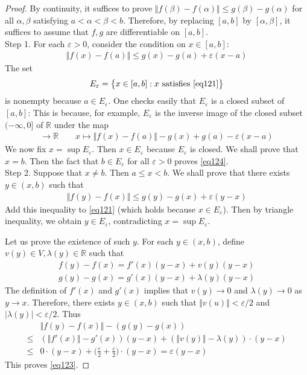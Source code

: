 \documentclass[12pt,b5paper,notitlepage]{article}
\theoremstyle{definition}
\theoremstyle{plain}
\newcommand{\Rbb}{\mathbb R}
\newcommand{\eps}{\varepsilon}
\numberwithin{equation}{section}
\begin{document}
\begin{proof}
By continuity, it suffices to prove $\Vert f(\beta)-f(\alpha)\Vert\leq g(\beta)-g(\alpha)$ for all $\alpha,\beta$ satisfying $a<\alpha<\beta<b$. Therefore, by replacing $[a,b]$ by $[\alpha,\beta]$, it suffices to assume that $f,g$ are differentiable on $[a,b]$.\\[-1ex]

Step 1. For each $\eps>0$, consider the condition on $x\in[a,b]$:
\begin{align}
\Vert f(x)-f(a)\Vert\leq g(x)-g(a)+\eps(x-a)\label{eq121}
\end{align}
The set
\begin{align*}
E_\eps=\big\{x\in[a,b]:x\text{ satisfies \eqref{eq121}}\big\}
\end{align*}
is nonempty because $a\in E_\eps$. One checks easily that $E_\eps$ is a closed subset of $[a,b]$: This is because, for example, $E_\eps$ is the inverse image of the closed subset $(-\infty,0]$ of $\Rbb$ under the map
\begin{gather}
[a,b]\rightarrow\Rbb\qquad x\mapsto \Vert f(x)-f(a)\Vert- g(x)+g(a)-\eps(x-a)  \label{eq122}
\end{gather}
We now fix $x=\sup E_\eps$. Then $x\in E_\eps$ because $E_\eps$ is closed. We shall prove that $x=b$. Then the fact that $b\in E_\eps$ for all $\eps>0$ proves \eqref{eq124}.\\[-1ex]


Step 2. Suppose that $x\neq b$. Then $a\leq x<b$. We shall prove that there exists $y\in(x,b)$ such that
\begin{align}
\Vert f(y)-f(x)\Vert\leq g(y)-g(x)+\eps(y-x) \label{eq123}
\end{align}
Add this inequality to \eqref{eq121} (which holds because $x\in E_\eps$). Then by triangle inequality, we obtain $y\in E_\eps$, contradicting $x=\sup E_\eps$.


Let us prove the existence of such $y$. For each $y\in (x,b)$, define $v(y)\in V,\lambda(y)\in\Rbb$ such that
\begin{gather*}
f(y)-f(x)=f'(x)(y-x)+v(y)(y-x)\\
g(y)-g(x)=g'(x)(y-x)+\lambda(y)(y-x)
\end{gather*}
The definition of $f'(x)$ and $g'(x)$ implies that $v(y)\rightarrow0$ and $\lambda(y)\rightarrow0$ as $y\rightarrow x$. Therefore, there exists $y\in(x,b)$ such that $\Vert v(u)\Vert<\eps/2$ and $|\lambda(y)|<\eps/2$. Thus
\begin{align*}
&\Vert f(y)-f(x)\Vert-(g(y)-g(x))\nonumber\\
\leq&(\Vert f'(x)\Vert-g'(x)) (y-x)+(\Vert v(y)\Vert-\lambda(y))\cdot (y-x)\nonumber\\
\leq&0\cdot(y-x)+\big(\frac\eps2+\frac\eps2\big)\cdot(y-x)=\eps(y-x)
\end{align*}
This proves \eqref{eq123}.
\end{proof}
\end{document}
